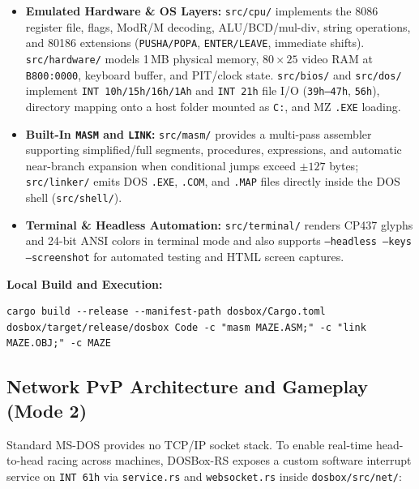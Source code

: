 \documentclass[11pt,a4paper]{article}
\begin{document}
\begin{itemize}
    \item \textbf{Emulated Hardware \& OS Layers:} \texttt{src/cpu/} implements the 8086 register file, flags, ModR/M decoding, ALU/BCD/mul-div, string operations, and 80186 extensions (\texttt{PUSHA/POPA}, \texttt{ENTER/LEAVE}, immediate shifts). \texttt{src/hardware/} models 1\,MB physical memory, $80\times 25$ video RAM at \texttt{B800:0000}, keyboard buffer, and PIT/clock state. \texttt{src/bios/} and \texttt{src/dos/} implement \texttt{INT 10h/15h/16h/1Ah} and \texttt{INT 21h} file I/O (\texttt{39h--47h}, \texttt{56h}), directory mapping onto a host folder mounted as \texttt{C:}, and MZ \texttt{.EXE} loading.
    \item \textbf{Built-In \texttt{MASM} and \texttt{LINK}:} \texttt{src/masm/} provides a multi-pass assembler supporting simplified/full segments, procedures, expressions, and automatic near-branch expansion when conditional jumps exceed $\pm 127$ bytes; \texttt{src/linker/} emits DOS \texttt{.EXE}, \texttt{.COM}, and \texttt{.MAP} files directly inside the DOS shell (\texttt{src/shell/}).
    \item \textbf{Terminal \& Headless Automation:} \texttt{src/terminal/} renders CP437 glyphs and 24-bit ANSI colors in terminal mode and also supports \texttt{--headless --keys --screenshot} for automated testing and HTML screen captures.
\end{itemize}

\textbf{Local Build and Execution:}
\begin{verbatim}
cargo build --release --manifest-path dosbox/Cargo.toml
dosbox/target/release/dosbox Code -c "masm MAZE.ASM;" -c "link MAZE.OBJ;" -c MAZE
\end{verbatim}

\subsection{Network PvP Architecture and Gameplay (Mode 2)}
Standard MS-DOS provides no TCP/IP socket stack. To enable real-time head-to-head racing across machines, DOSBox-RS exposes a custom software interrupt service on \texttt{INT 61h} via \texttt{service.rs} and \texttt{websocket.rs} inside \texttt{dosbox/src/net/}:
\end{document}
